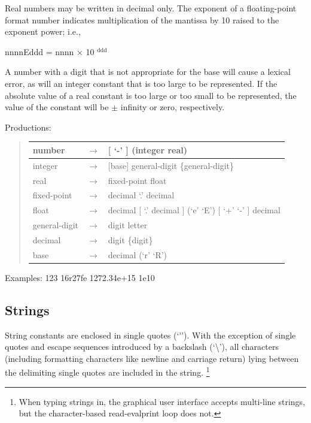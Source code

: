 \documentclass[letterpaper,10pt,english]{sphinxmanual}
\begin{document}
Real numbers may be written in decimal only. The exponent of a floating-point format number indicates
multiplication of the mantissa by 10 raised to the exponent power; i.e.,

nnnnEddd = nnnn × 10 $^{\text{ddd}}$

A number with a digit that is not appropriate for the base will cause a lexical error, as will an integer
constant that is too large to be represented. If the absolute value of a real constant is too large
or too small to be represented, the value of the constant will be \(\pm\) infinity or zero, respectively.

Productions:
\begin{quote}

\begin{tabulary}{\linewidth}{|L|L|L|}
\hline

number
 & 
\(\rightarrow\)
 & 
{[} ‘-’ {]} (integer \textbar{} real)
\\\hline

integer
 & 
\(\rightarrow\)
 & 
{[}base{]} general-digit \{general-digit\}
\\\hline

real
 & 
\(\rightarrow\)
 & 
fixed-point \textbar{} float
\\\hline

fixed-point
 & 
\(\rightarrow\)
 & 
decimal ‘.’ decimal
\\\hline

float
 & 
\(\rightarrow\)
 & 
decimal {[} ‘.’ decimal {]} (‘e’ \textbar{} ‘E’) {[} ‘+’ \textbar{} ‘-’ {]} decimal
\\\hline

general-digit
 & 
\(\rightarrow\)
 & 
digit \textbar{} letter
\\\hline

decimal
 & 
\(\rightarrow\)
 & 
digit \{digit\}
\\\hline

base
 & 
\(\rightarrow\)
 & 
decimal (‘r’ \textbar{} ‘R’)
\\\hline
\end{tabulary}

\end{quote}

Examples: 123 16r27fe 1272.34e+15 1e10


\subsection{Strings}
\label{langref:strings}\label{langref:index-68}
String constants are enclosed in single quotes (‘’’). With the exception of single quotes and escape
sequences introduced by a backslash (‘\textbackslash{}’), all characters (including formatting characters like
newline and carriage return) lying between the delimiting single quotes are included in the string. \footnote{
When typing strings in, the graphical user interface accepts multi-line strings, but the character-based read-evalprint loop does not.
}
\end{document}
